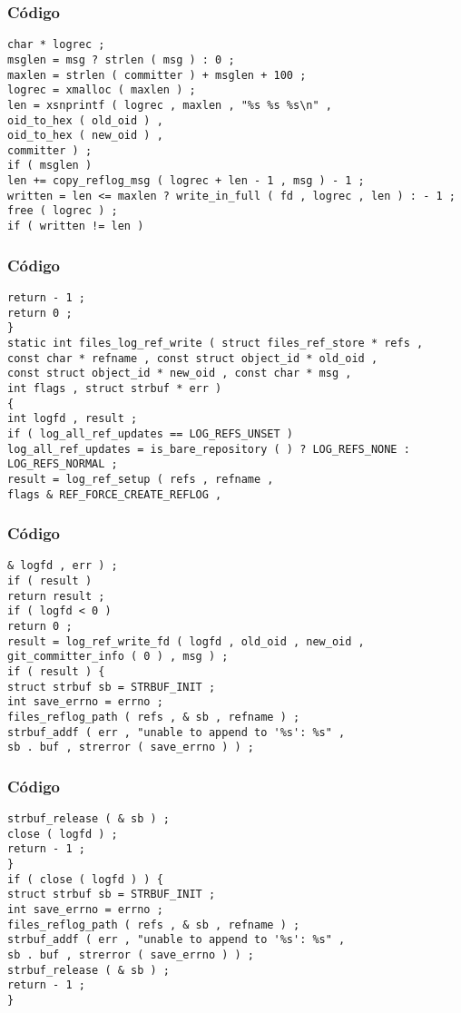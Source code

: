 \documentclass{beamer}
\begin{document}
\begin{frame}[fragile]
\frametitle{C\'odigo}
\begin{verbatim}
char * logrec ; 
msglen = msg ? strlen ( msg ) : 0 ; 
maxlen = strlen ( committer ) + msglen + 100 ; 
logrec = xmalloc ( maxlen ) ; 
len = xsnprintf ( logrec , maxlen , "%s %s %s\n" , 
oid_to_hex ( old_oid ) , 
oid_to_hex ( new_oid ) , 
committer ) ; 
if ( msglen ) 
len += copy_reflog_msg ( logrec + len - 1 , msg ) - 1 ; 
written = len <= maxlen ? write_in_full ( fd , logrec , len ) : - 1 ; 
free ( logrec ) ; 
if ( written != len ) 
\end{verbatim}
\end{frame}
\begin{frame}[fragile]
\frametitle{C\'odigo}
\begin{verbatim}
return - 1 ; 
return 0 ; 
} 
static int files_log_ref_write ( struct files_ref_store * refs , 
const char * refname , const struct object_id * old_oid , 
const struct object_id * new_oid , const char * msg , 
int flags , struct strbuf * err ) 
{ 
int logfd , result ; 
if ( log_all_ref_updates == LOG_REFS_UNSET ) 
log_all_ref_updates = is_bare_repository ( ) ? LOG_REFS_NONE : LOG_REFS_NORMAL ; 
result = log_ref_setup ( refs , refname , 
flags & REF_FORCE_CREATE_REFLOG , 
\end{verbatim}
\end{frame}
\begin{frame}[fragile]
\frametitle{C\'odigo}
\begin{verbatim}
& logfd , err ) ; 
if ( result ) 
return result ; 
if ( logfd < 0 ) 
return 0 ; 
result = log_ref_write_fd ( logfd , old_oid , new_oid , 
git_committer_info ( 0 ) , msg ) ; 
if ( result ) { 
struct strbuf sb = STRBUF_INIT ; 
int save_errno = errno ; 
files_reflog_path ( refs , & sb , refname ) ; 
strbuf_addf ( err , "unable to append to '%s': %s" , 
sb . buf , strerror ( save_errno ) ) ; 
\end{verbatim}
\end{frame}
\begin{frame}[fragile]
\frametitle{C\'odigo}
\begin{verbatim}
strbuf_release ( & sb ) ; 
close ( logfd ) ; 
return - 1 ; 
} 
if ( close ( logfd ) ) { 
struct strbuf sb = STRBUF_INIT ; 
int save_errno = errno ; 
files_reflog_path ( refs , & sb , refname ) ; 
strbuf_addf ( err , "unable to append to '%s': %s" , 
sb . buf , strerror ( save_errno ) ) ; 
strbuf_release ( & sb ) ; 
return - 1 ; 
} 
\end{verbatim}
\end{frame}
\end{document}
